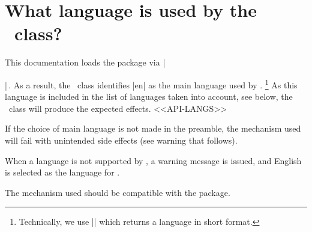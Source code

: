 \documentclass{tutodoc}
\begin{document}
\section{What language is used by the \thisproj\ class?}

This documentation loads the  package via \tdocinlatex|\usepackage[english]{babel}|\,.
As a result, the \thisproj\ class identifies \tdocinlatex|en| as the main language used by .%
\footnote{
    Technically, we use \tdocinlatex|| which returns a language in short format.
}
As this language is included in the list of languages taken into account, see below, the \thisproj\ class will produce the expected effects.
<<API-LANGS>>


\begin{tdoccaut}
    If the choice of main language is not made in the preamble, the mechanism used will fail with unintended side effects (see warning that follows).
\end{tdoccaut}


\begin{tdocwarn}
    When a language is not supported by \thisproj, a warning message is issued, and English is selected as the language for \thisproj.
\end{tdocwarn}


\begin{tdocnote}
    The mechanism used should be compatible with the  package.
\end{tdocnote}
\end{document}
